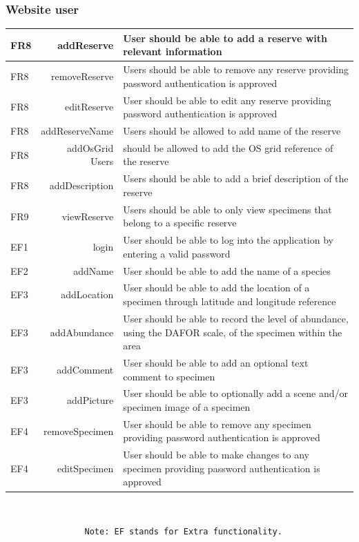 	\subsubsection{Website user}
	\begin{tabular}{| l  r | p{10cm} |}
		\hline
		FR8 & addReserve & User should be able to add a reserve with relevant information \\ \hline
		FR8 & removeReserve & Users should be able to remove any reserve providing password authentication is approved \\ \hline
		FR8 & editReserve & User should be able to edit any reserve providing password authentication is approved \\ \hline
		FR8 & addReserveName & Users should be allowed to add name of the reserve \\ \hline
		FR8 & addOsGrid Users & should be allowed to add the OS grid reference of the reserve \\ \hline
		FR8 & addDescription & Users should be able to add a brief description of the reserve \\ \hline
		FR9 & viewReserve & Users should be able to only view specimens that belong to a specific reserve \\ \hline
		EF1 & login  & User should be able to log into the application by entering a valid password\\ \hline
		EF2 & addName & User should be able to add the name of a species \\ \hline
		EF3 & addLocation  & User should be able to add the location of a specimen through latitude and longitude reference \\ \hline
		EF3 & addAbundance & User should be able to record the level of abundance, using the DAFOR scale, of the specimen within the area \\ \hline
		EF3 & addComment & User should be able to add an optional text comment to specimen\\ \hline
		EF3 & addPicture & User should be able to optionally add a scene and/or specimen image of a specimen \\ \hline
		EF4 & removeSpecimen & User should be able to remove any specimen providing password authentication is approved \\ \hline
		EF4 & editSpecimen & User should be able to make changes to any specimen providing password authentication is approved \\ \hline
	\end{tabular} \\
\begin{verbatim}
        		Note: EF stands for Extra functionality.
	\end{verbatim}
